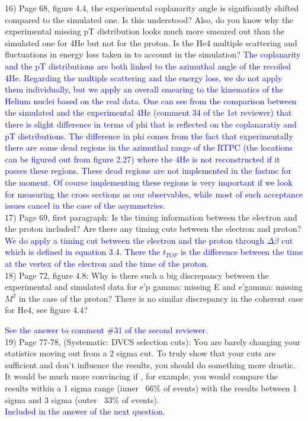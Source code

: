 16) Page 68, figure 4.4, the experimental coplanarity angle is significantly 
shifted compared to the simulated one. Is this understood? Also, do you know 
why the experimental missing pT distribution looks much more smeared out than 
the simulated one for 4He but not for the proton. Is the He4 multiple 
scattering and fluctuations in energy loss taken in to account in the 
simulation?  \textcolor{blue}{
   The coplanarity and the pT distributions are both linked to the azimuthal 
   angle of the recoiled 4He. Regarding the multiple scattering and the energy 
   loss, we do not apply them individually, but we apply an overall smearing to 
   the kinematics of the Helium nuclei based on the real data. One can see from 
   the comparison between the simulated and the experimental 4He (comment 34 of 
   the 1st reviewer) that there is slight difference in terms of phi that is 
   reflected on the coplanaratiy and pT distributions. The difference in phi 
   comes from the fact that experimentally there are some dead regions in the 
   azimuthal range of the RTPC (the locations can be figured out from figure 
   2.27) where the 4He is not reconstructed if it passes these regions.  These 
   dead regions are not implemented in the fastmc for the moment. Of course 
   implementing these regions is very important if we look for measuring the 
   cross sections as our observables, while most of such acceptance issues 
   cancel in the case of the asymmetries.}\\

17) Page 69, first paragraph:  Is the timing information between the electron 
and the proton included? Are there any timing cuts between the electron and 
proton?
\textcolor{blue}{ We do apply a timing cut between the electron and the proton 
   through $\Delta \beta$ cut which is defined in equation 3.4. There the 
   $t_{TOF}$ is the difference between the time at the vertex of the electron 
and the time of the proton.}\\  

18) Page 72, figure 4.8: Why is there such a big discrepancy between the 
experimental and simulated data for e'p gamma: missing E  and  e'gamma: missing 
$M^{2}$ in the case of the proton?  There is no similar discrepancy in the 
coherent case for He4, see figure 4.4?  

\textcolor{blue}{ See the answer to comment \#31 of the second reviewer.}\\

19) Page 77-78, (Systematic: DVCS selection cuts): You are barely changing your 
statistics moving out from a 2 sigma cut. To truly show that your cuts are 
sufficient and don't influence the results, you should do something more 
drastic. It would be much more convincing if , for example, you would compare 
the results within a 1 sigma range (inner ~66$\%$ of events) with the results 
between 1 sigma and 3 sigma (outer ~33$\%$ of events).\\
 \textcolor{blue}{Included in the answer of the next question.}\\

